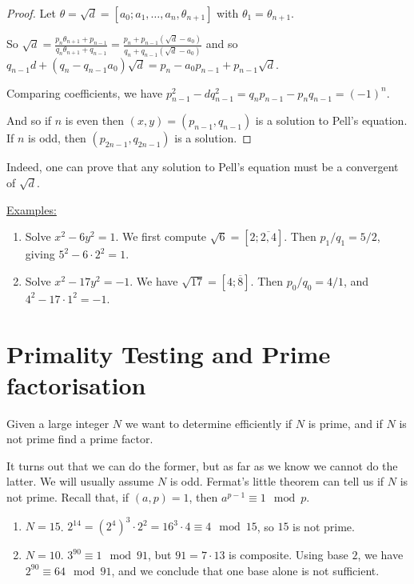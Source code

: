 \documentclass[10pt,a4paper]{article}
\begin{document}
\begin{proof}
Let $\theta = \sqrt{d} = [a_0;a_1,\ldots, a_n, \theta_{n+1}]$ with $\theta_1=\theta_{n+1}$.

So $\sqrt{d} = \frac{p_n\theta_{n+1}+p_{n-1}}{q_n\theta_{n+1}+q_{n-1}} = \frac{p_n+p_{n-1}(\sqrt{d}-a_0)}{q_n+q_{n-1}(\sqrt{d}-a_0)}$ and so $q_{n-1}d + (q_n-q_{n-1}a_0)\sqrt{d} = p_n - a_0p_{n-1}+p_{n-1}\sqrt{d}$.

Comparing coefficients, we have $p_{n-1}^2 - dq_{n-1}^2 = q_np_{n-1}-p_nq_{n-1} = (-1)^n$.

And so if $n$ is even then $(x,y)=(p_{n-1},q_{n-1})$ is a solution to Pell's equation. If $n$ is odd, then $(p_{2n-1},q_{2n-1})$ is a solution.
\end{proof}
Indeed, one can prove that any solution to Pell's equation must be a convergent of $\sqrt{d}$.

\underline{Examples:}
\begin{enumerate}
\item Solve $x^2-6y^2 = 1$. We first compute $\sqrt{6} = [2; \overline{2,4}]$. Then $p_1/q_1 = 5/2$, giving $5^2-6\cdot 2^2 = 1$.
\item Solve $x^2-17y^2 = -1$. We have $\sqrt{17} = [4;\overline{8}]$. Then $p_0/q_0 = 4/1$, and $4^2-17\cdot 1^2 = -1$.
\end{enumerate}

\section{Primality Testing and Prime factorisation}
Given a large integer $N$ we want to determine efficiently if $N$ is prime, and if $N$ is not prime find a prime factor.

It turns out that we can do the former, but as far as we know we cannot do the latter. We will usually assume $N$ is odd. Fermat's little theorem can tell us if $N$ is not prime. Recall that, if $(a,p)=1$, then $a^{p-1} \equiv 1 \mod p$. 

\begin{enumerate}
\item $N = 15$. $2^{14} = (2^4)^3\cdot 2^2 = 16^3\cdot 4 \equiv 4 \mod 15$, so $15$ is not prime.

\item $N=10$. $3^90 \equiv 1 \mod 91$, but $91=7\cdot 13$ is composite. Using base $2$, we have $2^90 \equiv 64 \mod 91$, and we conclude that one base alone is not sufficient. 
\end{enumerate}
\end{document}
